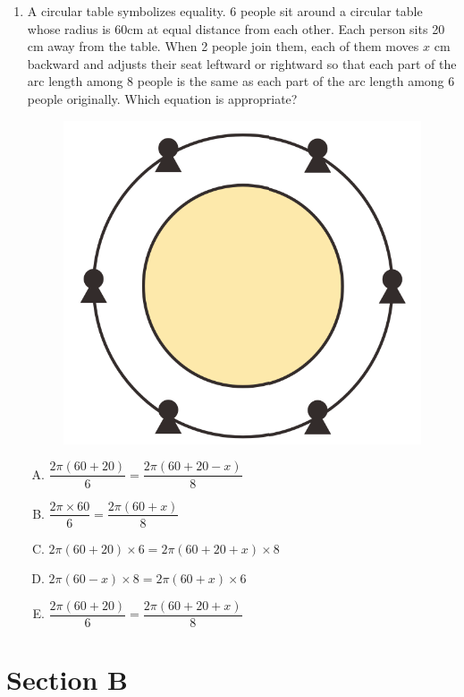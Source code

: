 \documentclass[12pt]{scrartcl}
\begin{document}
\begin{enumerate}
    \item A circular table symbolizes equality. 6 people sit around a circular table whose radius is 60cm at equal distance from each other. Each person sits 20 cm away from the table. When 2 people join them, each of them moves $x$ cm backward and adjusts their seat leftward or rightward so that each part of the arc length among 8 people is the same as each part of the arc length among 6 people originally. Which equation is appropriate?
    \begin{figure}[h]
        \centering
        \includegraphics[scale=0.4]{StarGen/0Figure/wmi2023G6A-num13.png}
    \end{figure}
        \begin{enumerate}[(A)]
            \item $\dfrac{2\pi(60+20)}{6} = \dfrac{2\pi(60+20-x)}{8}$
            \item $\dfrac{2\pi \times 60}{6} = \dfrac{2\pi(60+x)}{8}$
            \item $2\pi(60+20) \times 6 = 2\pi(60+20+x) \times 8$
            \item $2\pi(60-x) \times 8 = 2\pi(60+x) \times 6$
            \item $\dfrac{2\pi(60+20)}{6} = \dfrac{2\pi(60+20+x)}{8}$
        \end{enumerate} \hrulefill
\end{enumerate}

\newpage
\section{Section B}
\end{document}
